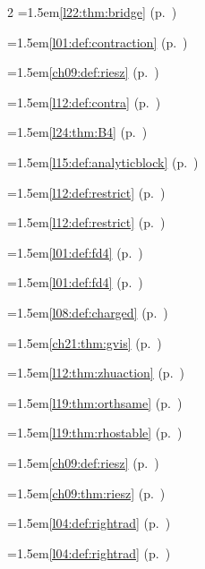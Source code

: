 \begin{multicols}{2}
\hangindent=1.5em\quad \ref{l22:thm:bridge} (p.~\pageref{l22:thm:bridge})\par
\hangindent=1.5em\quad \ref{l01:def:contraction} (p.~\pageref{l01:def:contraction})\par
\hangindent=1.5em\quad \ref{ch09:def:riesz} (p.~\pageref{ch09:def:riesz})\par
\hangindent=1.5em\quad \ref{l12:def:contra} (p.~\pageref{l12:def:contra})\par
\hangindent=1.5em\quad \ref{l24:thm:B4} (p.~\pageref{l24:thm:B4})\par
\hangindent=1.5em\quad \ref{l15:def:analyticblock} (p.~\pageref{l15:def:analyticblock})\par
\hangindent=1.5em\quad \ref{l12:def:restrict} (p.~\pageref{l12:def:restrict})\par
\hangindent=1.5em\quad \ref{l12:def:restrict} (p.~\pageref{l12:def:restrict})\par
\hangindent=1.5em\quad \ref{l01:def:fd4} (p.~\pageref{l01:def:fd4})\par
\hangindent=1.5em\quad \ref{l01:def:fd4} (p.~\pageref{l01:def:fd4})\par
\hangindent=1.5em\quad \ref{l08:def:charged} (p.~\pageref{l08:def:charged})\par
\hangindent=1.5em\quad \ref{ch21:thm:gvis} (p.~\pageref{ch21:thm:gvis})\par
\hangindent=1.5em\quad \ref{l12:thm:zhuaction} (p.~\pageref{l12:thm:zhuaction})\par
\hangindent=1.5em\quad \ref{l19:thm:orthsame} (p.~\pageref{l19:thm:orthsame})\par
\hangindent=1.5em\quad \ref{l19:thm:rhostable} (p.~\pageref{l19:thm:rhostable})\par
\hangindent=1.5em\quad \ref{ch09:def:riesz} (p.~\pageref{ch09:def:riesz})\par
\hangindent=1.5em\quad \ref{ch09:thm:riesz} (p.~\pageref{ch09:thm:riesz})\par
\hangindent=1.5em\quad \ref{l04:def:rightrad} (p.~\pageref{l04:def:rightrad})\par
\hangindent=1.5em\quad \ref{l04:def:rightrad} (p.~\pageref{l04:def:rightrad})\par

\end{multicols}

